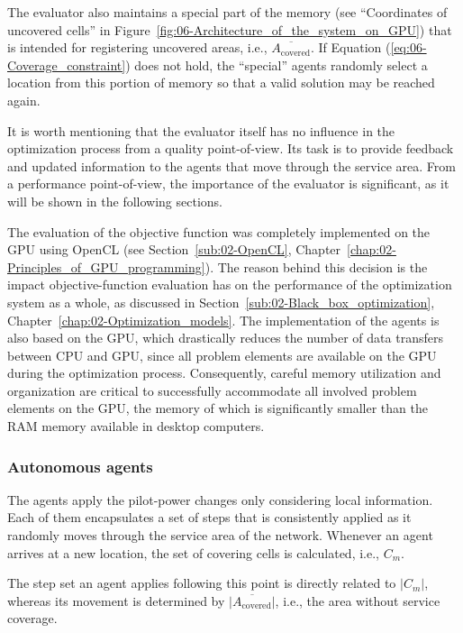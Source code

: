 The evaluator also maintains a special part of the memory (see ``Coordinates
of uncovered cells'' in Figure~\ref{fig:06-Architecture_of_the_system_on_GPU})
that is intended for registering uncovered areas, i.e., $\overline{A_{\mathrm{covered}}}$.
If Equation (\ref{eq:06-Coverage_constraint}) does not hold, the
``special'' agents randomly select a location from this portion
of memory so that a valid solution may be reached again.

It is worth mentioning that the evaluator itself has no influence
in the optimization process from a quality point-of-view. Its task
is to provide feedback and updated information to the agents that
move through the service area. From a performance point-of-view, the
importance of the evaluator is significant, as it will be shown in
the following sections.

\bigskip{}


The evaluation of the objective function was completely implemented
on the GPU using OpenCL (see Section~\ref{sub:02-OpenCL}, Chapter~\ref{chap:02-Principles_of_GPU_programming}).
The reason behind this decision is the impact objective-function evaluation
has on the performance of the optimization system as a whole, as discussed
in Section~\ref{sub:02-Black_box_optimization}, Chapter~\ref{chap:02-Optimization_models}.
The implementation of the agents is also based on the GPU, which drastically
reduces the number of data transfers between CPU and GPU, since all
problem elements are available on the GPU during the optimization
process. Consequently, careful memory utilization and organization
are critical to successfully accommodate all involved problem elements
on the GPU, the memory of which is significantly smaller than the
RAM memory available in desktop computers.


\subsubsection{Autonomous agents}

The agents apply the pilot-power changes only considering local information.
Each of them encapsulates a set of steps that is consistently applied
as it randomly moves through the service area of the network. Whenever
an agent arrives at a new location, the set of covering cells is calculated,
i.e., $C_{m}$.

The step set an agent applies following this point is directly related
to $\vert C_{m}\vert$, whereas its movement is determined by $\vert\overline{A_{\mathrm{covered}}}\vert$,
i.e., the area without service coverage.

